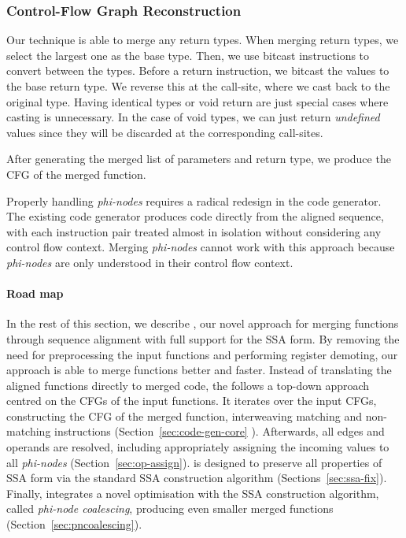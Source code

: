 \subsubsection{Control-Flow Graph Reconstruction}

Our technique is able to merge any return types.
When merging return types, we select the largest one as the base type.
Then, we use bitcast instructions to convert between the types.
Before a return instruction, we bitcast the values to the base return type.
We reverse this at the call-site, where we cast back to the original type.
Having identical types or void return are just special cases where casting is
unnecessary.
In the case of void types, we can just return \textit{undefined} values since they
will be discarded at the corresponding call-sites.

After generating the merged list of parameters and return type, we produce the
CFG of the merged function.









Properly handling \textit{phi-nodes} requires a radical redesign in the code generator. The existing code generator produces code directly
from the aligned sequence, with each instruction pair treated almost in isolation without considering any control flow context. Merging
\textit{phi-nodes} cannot work with this approach because \textit{phi-nodes} are only understood in their control flow context.

\paragraph*{Road map} In the rest of this section, we describe {\ProjName}, our novel approach for merging functions through sequence alignment with full
support for the SSA form. By removing the need for preprocessing the input functions and performing register demoting, our approach is able
to merge functions better and faster. Instead of translating the aligned functions directly to merged code, the {\ProjName} follows a
top-down approach centred on the CFGs of the input functions. It iterates over the input CFGs, constructing the
CFG of the merged function, interweaving matching and non-matching instructions (Section~\ref{sec:code-gen-core}
). Afterwards, all edges and operands are resolved, including appropriately assigning the incoming values to all \textit{phi-nodes} (Section~\ref{sec:op-assign}).
{\ProjName} is designed to preserve all properties of SSA form via the standard SSA construction algorithm (Sections~\ref{sec:ssa-fix}).
Finally, {\ProjName} integrates a novel optimisation with the SSA construction algorithm, called \textit{phi-node coalescing}, producing even smaller merged functions (Section~\ref{sec:pncoalescing}).

